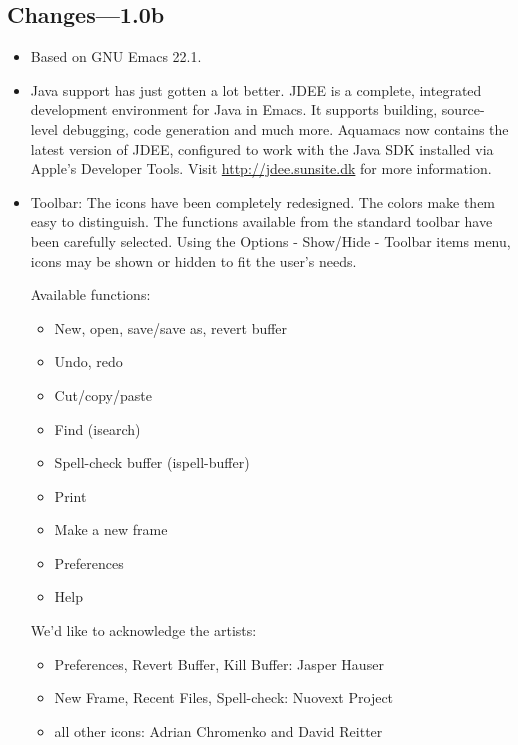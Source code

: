 \subsection{Changes---1.0b}


\begin{itemize}

\item Based on GNU Emacs 22.1.

\item Java support has just gotten a lot better. JDEE is a complete,
        integrated development environment for Java in Emacs. It supports
        building, source-level debugging, code generation and much
        more. Aquamacs now contains the latest version of JDEE, configured
        to work with the Java SDK installed via Apple's Developer
        Tools. Visit \url{http://jdee.sunsite.dk} for more information.

\item Toolbar: The icons have been completely redesigned. The colors
        make them easy to distinguish.  The functions available from the
        standard toolbar have been carefully selected.
        Using the Options - Show/Hide - Toolbar items menu,
        icons may be shown or hidden to fit the user's needs.

        Available functions:
        \begin{itemize}
        \item New, open, save/save as, revert buffer
        \item Undo, redo
        \item Cut/copy/paste
        \item Find (isearch)
        \item Spell-check buffer (ispell-buffer)
        \item Print
        \item Make a new frame
        \item Preferences
        \item Help
        \end{itemize}

        We'd like to acknowledge the artists:
        \begin{itemize}
        \item Preferences, Revert Buffer, Kill Buffer: Jasper Hauser
        \item New Frame, Recent Files, Spell-check: Nuovext Project
        \item all other icons: Adrian Chromenko and David Reitter
         \end{itemize}


\end{itemize}
